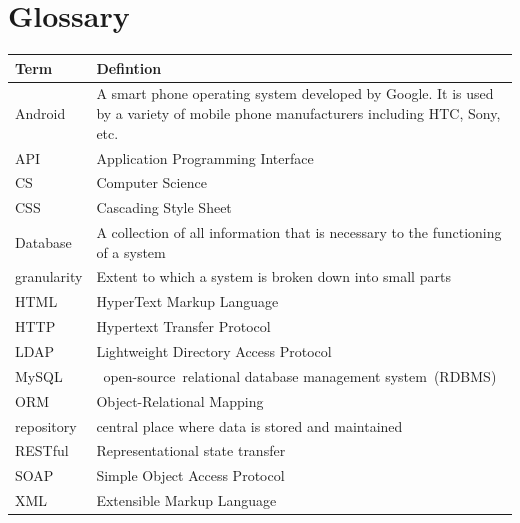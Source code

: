 \documentclass[12pt]{article}
\begin{document}
	\section{Glossary}
		\begin{tabular}{|p{2.1in}|p{2.2in}|} \hline 
			Term & Defintion \\ \hline 
			Android & A smart phone operating system developed by Google. It is used by a variety of mobile phone manufacturers including HTC, Sony, etc. \newline  \\ \hline 
			API & Application Programming Interface \\ \hline 
			CS & Computer Science \\ \hline 
			CSS & Cascading Style Sheet \\ \hline 
			Database & A collection of all information that is necessary to the functioning of a system \\ \hline 
			granularity & Extent to which a system is broken down into small parts \\ \hline 
			HTML & HyperText Markup Language \\ \hline 
			HTTP & Hypertext Transfer Protocol \\ \hline 
			LDAP & Lightweight Directory Access Protocol \newline  \\ \hline 
			MySQL & ~open-source~relational database management system~(RDBMS) \\ \hline 
			ORM & Object-Relational Mapping \\ \hline 
			repository & central place where data is stored and maintained \\ \hline 
			RESTful & Representational state transfer \\ \hline 
			SOAP & Simple Object Access Protocol \newline  \\ \hline 
			XML & Extensible Markup Language \\ \hline 
		\end{tabular}

		\vspace{0.2in}
		
			
	
	
\end{document}
